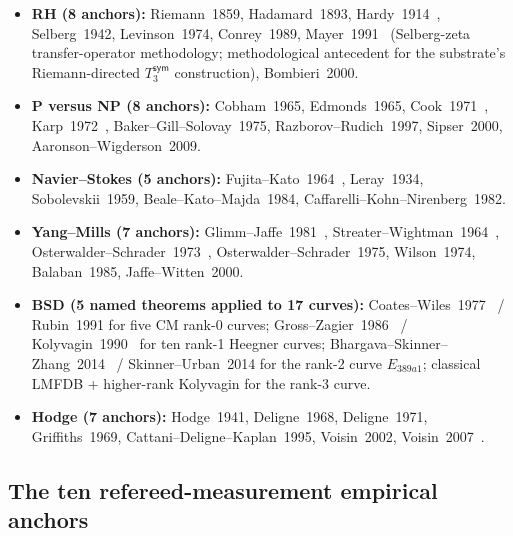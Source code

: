 \documentclass[11pt,a4paper]{amsart}
\theoremstyle{plain}
\theoremstyle{definition}
\begin{document}
\begin{itemize}[itemsep=2pt]
\item \textbf{RH (8 anchors):} Riemann~1859, Hadamard~1893, Hardy~1914~\cite{hardy1914}, Selberg~1942, Levinson~1974, Conrey~1989, Mayer~1991~\cite{mayer1991} (Selberg-zeta transfer-operator methodology; methodological antecedent for the substrate's Riemann-directed $T_3^{\textsf{sym}}$ construction), Bombieri~2000.
\item \textbf{P versus NP (8 anchors):} Cobham~1965, Edmonds~1965, Cook~1971~\cite{cook1971}, Karp~1972~\cite{karp1972}, Baker--Gill--Solovay~1975, Razborov--Rudich~1997, Sipser~2000, Aaronson--Wigderson~2009.
\item \textbf{Navier--Stokes (5 anchors):} Fujita--Kato~1964~\cite{fujita-kato1964}, Leray~1934, Sobolevskii~1959, Beale--Kato--Majda~1984, Caffarelli--Kohn--Nirenberg~1982.
\item \textbf{Yang--Mills (7 anchors):} Glimm--Jaffe~1981~\cite{glimm-jaffe1981}, Streater--Wightman~1964~\cite{streater-wightman1964}, Osterwalder--Schrader~1973~\cite{osterwalder-schrader1973}, Osterwalder--Schrader~1975, Wilson~1974, Balaban~1985, Jaffe--Witten~2000.
\item \textbf{BSD (5 named theorems applied to 17 curves):} Coates--Wiles~1977~\cite{coates-wiles1977} / Rubin~1991 for five CM rank-0 curves; Gross--Zagier~1986~\cite{gross-zagier1986} / Kolyvagin~1990~\cite{kolyvagin1990} for ten rank-1 Heegner curves; Bhargava--Skinner--Zhang~2014~\cite{bhargava-skinner-zhang2014} / Skinner--Urban~2014 for the rank-2 curve $E_{389a1}$; classical LMFDB + higher-rank Kolyvagin for the rank-3 curve.
\item \textbf{Hodge (7 anchors):} Hodge~1941, Deligne~1968, Deligne~1971, Griffiths~1969, Cattani--Deligne--Kaplan~1995, Voisin~2002, Voisin~2007~\cite{voisin2007}.
\end{itemize}

\subsection{The ten refereed-measurement empirical anchors}
\end{document}
